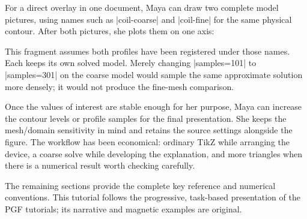 For a direct overlay in one document, Maya can draw two complete model pictures,
using names such as |coil-coarse| and |coil-fine| for the same physical contour.
After both pictures, she plots them on one axis:
\begin{codeexample}
\femmplot[profile=coil-coarse,component=By,abscissa=x,
  plot options={gray,dashed}]
\femmplot[profile=coil-fine,component=By,abscissa=x,
  plot options={red}]
\end{codeexample}
This fragment assumes both profiles have been registered under those names.
Each keeps its own solved model. Merely changing |samples=101| to |samples=301|
on the coarse model would sample the same approximate solution more densely;
it would not produce the fine-mesh comparison.

Once the values of interest are stable enough for her purpose, Maya can increase
the contour levels or profile samples for the final presentation. She keeps
the mesh/domain sensitivity in mind and retains the source settings alongside
the figure. The workflow has been economical: ordinary TikZ while arranging
the device, a coarse solve while developing the explanation, and more triangles
when there is a numerical result worth checking carefully.

The remaining sections provide the complete key reference and numerical
conventions. This tutorial follows the progressive, task-based presentation
of the PGF tutorials; its narrative and magnetic examples are original.
\clearpage
